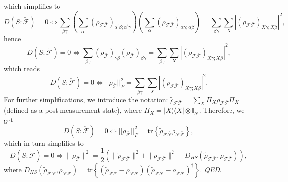 \documentclass[a4paper,11pt,accepted=2024-09-14]{quantumarticle}
\newcommand{\trace}[1]{\mathrm{tr}\left\{#1\right\}}
\newcommand{\+}         {\dagger}
\newcommand\cF{{\mathcal F}}
\newcommand{\tr}[1]{\mathrm{tr}\left\{#1\right\}}
\newcommand{\mc}[1]{\mathcal{#1}}
\begin{document}
which simplifies to
\begin{equation}
D(S:\check{\mc{F}})= 0  \Leftrightarrow \sum_{\beta\gamma} \left(\sum_{\alpha^{\prime}}(\rho_{\cF\bar{\cF}})_{\alpha^{\prime}\beta; \alpha^{\prime}\gamma}\right)\left(\sum_{\alpha}(\rho_{\cF\bar{\cF}})_{\alpha\gamma; \alpha\beta}\right)=\sum_{\beta\gamma}\sum_{X}|(\rho_{\cF\bar{\cF}})_{X\gamma; X\beta}|^2,
\end{equation}
hence
\begin{equation}
	D(S:\check{\mc{F}})= 0  \Leftrightarrow \sum_{\beta\gamma} (\rho_{\bar{\cF}})_{\gamma\beta}(\rho_{\bar{\cF}})_{\beta\gamma}=\sum_{\beta\gamma}\sum_{X}|(\rho_{\cF\bar{\cF}})_{X\gamma; X\beta}|^2,
\end{equation}
which reads
\begin{equation}
	D(S:\check{\mc{F}})= 0  \Leftrightarrow ||\rho_{\bar{\cF}}||^{2}_{F}=\sum_{\beta\gamma}\sum_{X}|(\rho_{\cF\bar{\cF}})_{X\gamma; X\beta}|^2.
\end{equation}
For further simplifications, we introduce the notation: $\tilde{\rho}_{\cF\bar{\cF}}= \sum_{X} \Pi_{X} \rho_{\cF\bar{\cF}} \Pi_{X} $ (defined as a post-measurement state), where $\Pi_{X}= |X\rangle\langle X| \otimes \mathbb{I}_{\bar{\mc{F}}}$. Therefore, we get
\begin{equation}
	D(S:\check{\mc{F}})= 0  \Leftrightarrow ||\rho_{\bar{\cF}}||^{2}_{F}=\tr{\tilde{\rho}_{\cF\bar{\cF}}\rho_{\cF\bar{\cF}}},
\end{equation}
which in turn simplifies to 
\begin{equation}
	D(S:\check{\mc{F}})= 0  \Leftrightarrow \| \rho_{\bar{\mc{F}}}\|^{2}=\frac{1}{2} \left(\| \tilde{\rho}_{\mc{F}\bar{\mc{F}}}\|^{2}+\| \rho_{\mc{F}\bar{\mc{F}}}\|^{2}- D_{HS}(\tilde{\rho}_{\mc{F}\bar{\mc{F}}},\rho_{\mc{F}\bar{\mc{F}}})\right),
\end{equation}
where $D_{HS}(\tilde{\rho}_{\mc{F}\bar{\mc{F}}},\rho_{\mc{F}\bar{\mc{F}}})= \trace{(\tilde{\rho}_{\mc{F}\bar{\mc{F}}}-\rho_{\mc{F}\bar{\mc{F}}})(\tilde{\rho}_{\mc{F}\bar{\mc{F}}}-\rho_{\mc{F}\bar{\mc{F}}})^{\dagger}}$. \textit{QED}.
\end{document}
